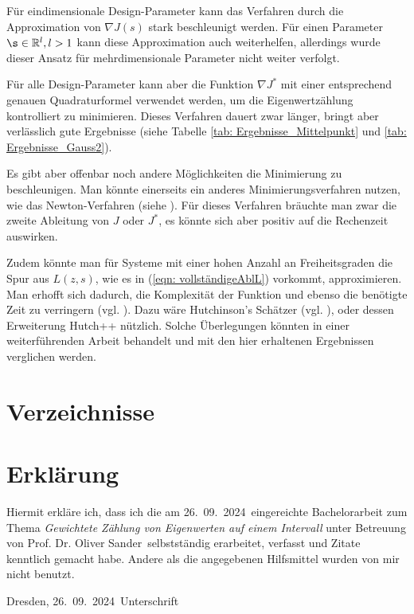 \documentclass[a4paper,12pt]{report}
\newcommand{\betreuer}{Prof. Dr. Oliver Sander}
\newcommand{\thema}{Gewichtete Zählung von Eigenwerten auf einem Intervall}
\newcommand{\datum}{26.\ 09.\ 2024} %
\newcommand{\R}{\mathbb R}
\newcommand{\zitat}[1]{\glqq #1\grqq}
\newcommand{\1}{\mathds{1}}
\theoremstyle{plain} %
\theoremstyle{definition} %
\theoremstyle{remark}
\begin{document}
      Für eindimensionale Design-Parameter kann das Verfahren durch die Approximation von $\nabla J(s)$ stark beschleunigt werden.
      Für einen Parameter $\s\in \R^l, l>1$ kann diese Approximation auch weiterhelfen, allerdings wurde dieser Ansatz für mehrdimensionale Parameter nicht weiter verfolgt.

      Für alle Design-Parameter kann aber die Funktion $\nabla J^*$ mit einer entsprechend genauen Quadraturformel verwendet werden, um die Eigenwertzählung kontrolliert zu minimieren.
      Dieses Verfahren dauert zwar länger, bringt aber verlässlich gute Ergebnisse (siehe Tabelle \ref{tab: Ergebnisse_Mittelpunkt} und \ref{tab: Ergebnisse_Gauss2}).

      Es gibt aber offenbar noch andere Möglichkeiten die Minimierung zu beschleunigen.
      Man könnte einerseits ein anderes Minimierungsverfahren nutzen, wie das Newton-Verfahren (siehe \cite[S. 290]{optimierungBurkhard}).
      Für dieses Verfahren bräuchte man zwar die zweite Ableitung von $J$ oder $J^*$, es könnte sich aber positiv auf die Rechenzeit auswirken.

      Zudem könnte man für Systeme mit einer hohen Anzahl an Freiheitsgraden die Spur aus $L(z,s)$, wie es in (\ref{eqn: vollständigeAblL}) vorkommt, approximieren.
      Man erhofft sich dadurch, die Komplexität der Funktion und ebenso die benötigte Zeit zu verringern (vgl. \cite[S. 128]{grundlageFutamura}).
      Dazu wäre Hutchinson's Schätzer (vgl. \cite[S. 142]{hutch++Meyer}), oder dessen Erweiterung \zitat{Hutch++}\cite[S. 142]{hutch++Meyer} nützlich.
      Solche Überlegungen könnten in einer weiterführenden Arbeit behandelt und mit den hier erhaltenen Ergebnissen verglichen werden.

\chapter{Verzeichnisse}
      \printbibliography
      \printacronyms[name=Abkürzungsverzeichnis, include={abbrev}]
      \chapter*{Erkl\"{a}rung}
      \thispagestyle{empty}
      Hiermit erkl\"{a}re ich, dass ich die am \datum\ eingereichte Bachelorarbeit zum Thema
      \emph{\thema} unter Betreuung von \betreuer\ selbstst\"{a}ndig erarbeitet,
      verfasst und Zitate kenntlich gemacht habe. Andere als die angegebenen Hilfsmittel
      wurden von mir nicht benutzt.

      \bigskip \bigskip \bigskip \bigskip \bigskip

      Dresden, \datum\ \hfill Unterschrift

      \normalsize
\end{document}
